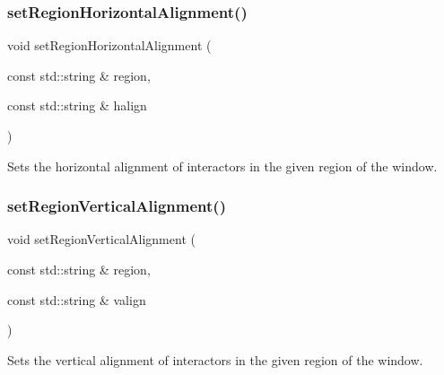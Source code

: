 \subsubsection{\texorpdfstring{set\+Region\+Horizontal\+Alignment()}{setRegionHorizontalAlignment()}\hspace{0.1cm}{\footnotesize\ttfamily [2/2]}}
{\footnotesize\ttfamily void set\+Region\+Horizontal\+Alignment (\begin{DoxyParamCaption}\item[{const std\+::string \&}]{region,  }\item[{const std\+::string \&}]{halign }\end{DoxyParamCaption})\hspace{0.3cm}{\ttfamily [virtual]}}



Sets the horizontal alignment of interactors in the given region of the window. 

\mbox{\label{classsgl_1_1GWindow_afbe22d897ce8ef25db52cbc3d456aa0a}} 
\subsubsection{\texorpdfstring{set\+Region\+Vertical\+Alignment()}{setRegionVerticalAlignment()}\hspace{0.1cm}{\footnotesize\ttfamily [1/2]}}
{\footnotesize\ttfamily void set\+Region\+Vertical\+Alignment (\begin{DoxyParamCaption}\item[{const std\+::string \&}]{region,  }\item[{const std\+::string \&}]{valign }\end{DoxyParamCaption})\hspace{0.3cm}{\ttfamily [virtual]}}



Sets the vertical alignment of interactors in the given region of the window. 

\mbox{\label{classsgl_1_1GWindow_a1efb2d3b67fb479aad27a6c0032ee70e}} 
